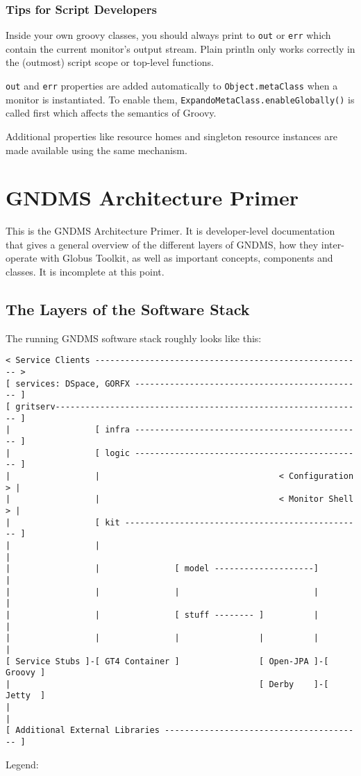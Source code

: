 \documentclass{article}
\begin{document}
\subsubsection{Tips for Script Developers}

Inside your own groovy classes, you should always print to
\verb!out! or \verb!err! which contain the current monitor's output
stream. Plain println only works correctly in the (outmost) script
scope or top-level functions.

\verb!out! and \verb!err! properties are added automatically to
\verb!Object.metaClass! when a monitor is instantiated. To enable
them, \verb!ExpandoMetaClass.enableGlobally()! is called first
which affects the semantics of Groovy.

Additional properties like resource homes and singleton resource
instances are made available using the same mechanism.

\section{GNDMS Architecture Primer}

This is the GNDMS Architecture Primer. It is developer-level
documentation that gives a general overview of the different layers
of GNDMS, how they inter-operate with Globus Toolkit, as well as
important concepts, components and classes. It is incomplete at
this point.

\subsection{The Layers of the Software Stack}

The running GNDMS software stack roughly looks like this:

\begin{verbatim}
< Service Clients ------------------------------------------------------ >
[ services: DSpace, GORFX ---------------------------------------------- ]    
[ gritserv-------------------------------------------------------------- ]
|                 [ infra ---------------------------------------------- ]
|                 [ logic ---------------------------------------------- ]
|                 |                                    < Configuration > |
|                 |                                    < Monitor Shell > |
|                 [ kit ------------------------------------------------ ]
|                 |                                                      |    
|                 |               [ model --------------------]          |
|                 |               |                           |          |    
|                 |               [ stuff -------- ]          |          |      
|                 |               |                |          |          |
[ Service Stubs ]-[ GT4 Container ]                [ Open-JPA ]-[ Groovy ]
|                                                  [ Derby    ]-[ Jetty  ]
|                                                                        |    
[ Additional External Libraries ---------------------------------------- ]
\end{verbatim}
Legend:
\end{document}

